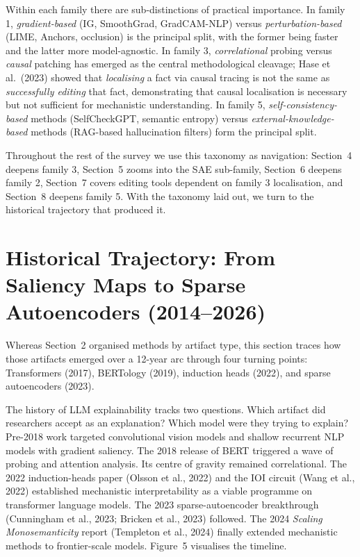 Within each family there are sub-distinctions of practical importance. In family 1, \emph{gradient-based} (IG, SmoothGrad, GradCAM-NLP) versus \emph{perturbation-based} (LIME, Anchors, occlusion) is the principal split, with the former being faster and the latter more model-agnostic. In family 3, \emph{correlational} probing versus \emph{causal} patching has emerged as the central methodological cleavage; Hase et al.~(2023) showed that \emph{localising} a fact via causal tracing is not the same as \emph{successfully editing} that fact, demonstrating that causal localisation is necessary but not sufficient for mechanistic understanding. In family 5, \emph{self-consistency-based} methods (SelfCheckGPT, semantic entropy) versus \emph{external-knowledge-based} methods (RAG-based hallucination filters) form the principal split.

Throughout the rest of the survey we use this taxonomy as navigation: Section~4 deepens family 3, Section~5 zooms into the SAE sub-family, Section~6 deepens family 2, Section~7 covers editing tools dependent on family 3 localisation, and Section~8 deepens family 5. With the taxonomy laid out, we turn to the historical trajectory that produced it.

\section{Historical Trajectory: From Saliency Maps to Sparse Autoencoders (2014--2026)}\label{historical-trajectory-from-saliency-maps-to-sparse-autoencoders-20142026}

Whereas Section~2 organised methods by artifact type, this section traces how those artifacts emerged over a 12-year arc through four turning points: Transformers (2017), BERTology (2019), induction heads (2022), and sparse autoencoders (2023).

The history of LLM explainability tracks two questions. Which artifact did researchers accept as an explanation? Which model were they trying to explain? Pre-2018 work targeted convolutional vision models and shallow recurrent NLP models with gradient saliency. The 2018 release of BERT triggered a wave of probing and attention analysis. Its centre of gravity remained correlational. The 2022 induction-heads paper (Olsson et al., 2022) and the IOI circuit (Wang et al., 2022) established mechanistic interpretability as a viable programme on transformer language models. The 2023 sparse-autoencoder breakthrough (Cunningham et al., 2023; Bricken et al., 2023) followed. The 2024 \emph{Scaling Monosemanticity} report (Templeton et al., 2024) finally extended mechanistic methods to frontier-scale models. Figure~5 visualises the timeline.

